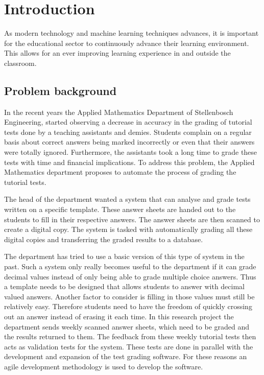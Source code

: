\chapter{Introduction}
\label{ch:Introduction}
\graphicspath{{Chapter1/Chapter1Figures/}}
As modern technology and machine learning techniques advances, it is important for the educational sector to continuously advance their learning environment. This allows for an ever improving learning experience in and outside the classroom. 

\section{Problem background}

In the recent years the Applied Mathematics Department of Stellenbosch Engineering, started observing a decrease in accuracy in the grading of tutorial tests done by a teaching assistants and demies.  Students complain on a regular basis about correct answers being marked incorrectly or even that their answers were totally ignored. Furthermore, the assistants took a long time to grade these tests with time and financial implications. To address this problem, the Applied Mathematics department proposes to automate the process of grading the tutorial tests.

The head of the department wanted a system that can analyse and grade tests written on a specific template. These answer sheets are handed out to the students to fill in their respective answers. The answer sheets are then scanned to create a digital copy. The system is tasked with automatically grading all these digital copies and transferring the graded results to a database.

The department has tried to use a basic version of this type of system in the past. Such a system only really becomes useful to the department if it can grade decimal values instead of only being able to grade multiple choice answers. Thus a template needs to be designed that allows students to answer with decimal valued answers. Another factor to consider is filling in those values must still be relatively easy. Therefore students need to have the freedom of quickly crossing out an answer instead of erasing it each time.
In this research project the department sends weekly scanned answer sheets, which need to be graded and the results returned to them. The feedback from these weekly tutorial tests then acts as validation tests for the system. These tests are done in parallel with the development and expansion of the test grading software. For these reasons an agile development methodology is used to develop the software.

